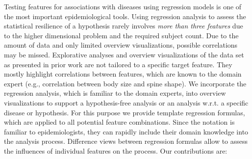\documentclass[journal]{style/vgtc} 			          %
\begin{document}
Testing features for associations with diseases using regression models is one of the most important epidemiological tools.
Using regression analysis to assess the statistical resilience of a hypothesis rarely involves \emph{more than three features} due to the higher dimensional problem and the required subject count.
Due to the amount of data and only limited overview visualizations, possible correlations may be missed.
Explorative analyses and overview visualizations of the data set as presented in prior work \cite{Klemm2014VIS} are not tailored to a specific target feature.
They mostly highlight correlations between features, which are known to the domain expert (e.g., correlation between body size and spine shape).
We incorporate the regression analysis, which is familiar to the domain experts, into overview visualizations to support a hypothesis-free analysis or an analysis w.r.t. a specific disease or hypothesis.
For this purpose we provide template regression formulas, which are applied to all potential feature combinations.
Since the notation is familiar to epidemiologists, they can rapidly include their domain knowledge into the analysis process.
Difference views between regression formulas allow to assess the influences of individual features on the process.
Our contributions are:
\end{document}
